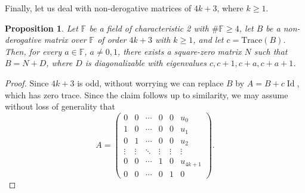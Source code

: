 \documentclass{amsart}
\DeclareMathOperator{\Id}{Id}
\def\FF{\mathbb{F}}
\newtheorem{proposition}[theorem]{Proposition}
\theoremstyle{definition}
\theoremstyle{remark}
\numberwithin{equation}{section}
\begin{document}
Finally, let us deal with non-derogative matrices of $4k+3$, where $k\ge 1$.

\begin{proposition}\label{4k+3}
Let $\FF$ be a field of characteristic 2 with $\#\FF\ge4$, let $B$ be a non-derogative matrix over $\FF$ of order $4k+3$ with $k\ge 1$, and let $c=\text{Trace}(B)$. Then, for every $a\in \FF$, $a\ne 0,1$, there exists a square-zero matrix $N$ such that $B=N+D$, where $D$ is diagonalizable with eigenvalues $c,c+1,c+a,c+a+1$.
\end{proposition}

\begin{proof}
Since $4k+3$ is odd, without worrying we can  replace $B$ by $A=B+c\Id$, which has zero trace. Since the claim follows up to similarity, we may assume without loss of generality that $$A=\left(\begin{array}{cccccc}
                                                                          0 & 0 & \cdots & 0 & 0 &u_0\\
                                                                          1 & 0 & \cdots & 0 & 0 &u_1\\
                                                                          0 & 1 & \cdots & 0 & 0 &u_2\\
                                                                          \vdots & \vdots & \ddots & \vdots & \vdots &\vdots\\
                                                                          0 & 0 & \cdots & 1 & 0 &u_{4k+1}\\
                                                                          0 & 0 & \cdots & 0 & 1 &0
                                                                        \end{array}\right).$$


\end{proof}
\end{document}
